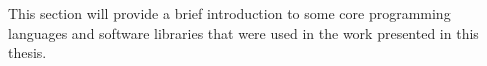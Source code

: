 This section will provide a brief introduction to some core programming languages and software libraries that were used in the work presented in this thesis.
